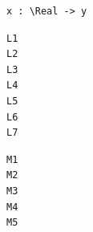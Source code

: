 \documentclass{article}
\begin{document}
\begin{lstlisting}
x : \Real -> y
\end{lstlisting}
\begin{lstlisting}[linerange={2-3,6-6}]
L1
L2
L3
L4
L5
L6
L7
\end{lstlisting}
\begin{lstlisting}[linerange={4}]
M1
M2
M3
M4
M5
\end{lstlisting}
\end{document}
